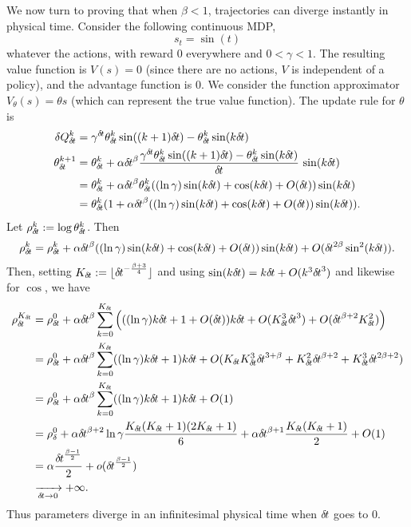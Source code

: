 We now turn to proving that when $\beta < 1$,
trajectories can diverge instantly in physical time. 
Consider the following continuous MDP, 
\begin{equation}
	s_t = \sin(t)
\end{equation}
whatever the actions,
with reward $0$ everywhere and $0 < \gamma < 1$.
The resulting value function is $V(s) = 0$ (since there
are no actions, $V$ is independent of a policy), and the advantage
function is $0$.
We consider the function approximator $V_\theta(s) = \theta s$ (which can
represent the true value function).
The update rule for $\theta$ is
\begin{align}
\delta Q_\deltat^k &= \gamma^\deltat \theta_\deltat^k \sin((k + 1)
\deltat) - \theta_\deltat^k \sin(k\deltat)\\
	\theta_\deltat^{k+1} &= \theta_\deltat^k + \alpha \deltat^\beta
	\frac{\gamma^\deltat \theta_\deltat^k \sin((k + 1) \deltat) -
	\theta_\deltat^k \sin(k\deltat)}{\deltat}\,\sin(k\deltat)
	\\
			     &= \theta_\deltat^k + \alpha \deltat^\beta
			     \theta_\deltat^k
			     ((\ln \gamma) \sin(k \deltat)
			     + \cos(k
			     \deltat)+\bigO(\deltat))\sin(k\deltat)\\
			     &= \theta_\deltat^k(1 + \alpha \deltat^\beta
			     ((\ln \gamma) \sin(k \deltat) + \cos(k
			     \deltat)+\bigO(\deltat))\sin(k\deltat)).
\end{align}
Let $\rho_{\delta\hspace{-.1em}t}^k \mathrel{\mathop{:}}= \log \theta_{\delta\hspace{-.1em}t}^k$. Then
\begin{align}
	\rho_{\delta\hspace{-.1em}t}^k = \rho_{\delta\hspace{-.1em}t}^k + \alpha {\delta\hspace{-.1em}t}^\beta ((\ln
	\gamma) \sin(k {\delta\hspace{-.1em}t}) + \cos(k
	{\delta\hspace{-.1em}t})+O({\delta\hspace{-.1em}t}))\sin(k{\delta\hspace{-.1em}t})+O({\delta\hspace{-.1em}t}^{2\beta}\sin^2(k{\delta\hspace{-.1em}t})).
\end{align}
Then, setting $K_{\delta\hspace{-.1em}t} \mathrel{\mathop{:}}= \lfloor {\delta\hspace{-.1em}t}^{-\frac{\beta +
3}{4}}\rfloor$ and using $\sin(k{\delta\hspace{-.1em}t})=k{\delta\hspace{-.1em}t}+O(k^3{\delta\hspace{-.1em}t}^3)$ and
likewise for $\cos$, we have
\begin{align}
	\rho_\deltat^{K_\deltat} &= \rho_\deltat^0 + \alpha \deltat^\beta
	\sum\limits_{k=0}^{K_\deltat} \left(((\ln \gamma)k\deltat +
	1+O(\deltat))k\deltat + \bigO(K_\deltat^3 \deltat^{3})
	+\bigO(\deltat^{\beta+2}K_\deltat^2)\right)\\
	&= \rho_\deltat^0 + \alpha \deltat^\beta
	\sum\limits_{k=0}^{K_\deltat} ((\ln \gamma) k\deltat +
	1)k\deltat + \bigO(K_\deltat K_\deltat^3 \deltat^{3 + \beta} +
	K_\deltat^2 \deltat^{\beta+2}+K_\deltat^3\deltat^{2\beta+2})\\
				 &= \rho_\deltat^0 + \alpha \deltat^\beta
				 \sum\limits_{k=0}^{K_\deltat} ((\ln
				 \gamma) k\deltat + 1)k\deltat +
				 \bigO(1)\\
				 &= \rho_\delta^0 + \alpha\deltat^{\beta
				 + 2} \ln\gamma \frac{K_\deltat
				 (K_\deltat + 1) (2 K_\deltat + 1)}{6} +
				 \alpha \deltat^{\beta + 1}
				 \frac{K_\deltat (K_\deltat + 1)}{2} +
				 O(1)\\
				 &= \alpha \frac{\deltat^{\frac{\beta - 1}{2}}}{2} + \smallo(\deltat^{\frac{\beta - 1}{2}})\\
				 &\xrightarrow[\deltat\to 0]{} +\infty.
\end{align}
Thus parameters diverge in an infinitesimal physical time when ${\delta\hspace{-.1em}t}$ goes to $0$.

